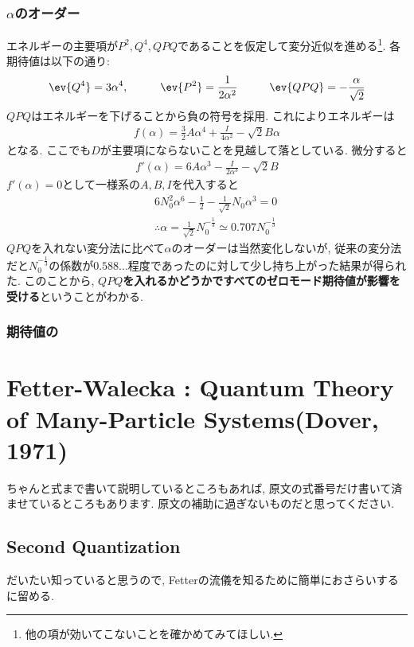 \documentclass[10.5pt,a4paper]{jreport}
\begin{document}
\subsection{$\alpha$のオーダー}
エネルギーの主要項が$P^2, Q^4, QPQ$であることを仮定して変分近似を進める\footnote{他の項が効いてこないことを確かめてみてほしい. }. 各期待値は以下の通り:
\begin{eqnarray}
  \ev{Q^4} = 3\alpha^4, \hspace{1cm}\ev{P^2} = \frac{1}{2\alpha^2}\hspace{1cm}\ev{QPQ} = -\frac{\alpha}{\sqrt{2}}
\end{eqnarray}
$QPQ$はエネルギーを下げることから負の符号を採用. これによりエネルギーは
\begin{eqnarray}
  f(\alpha) = \frac32A\alpha^4 + \frac{I}{4\alpha^2} - \sqrt{2}B\alpha
\end{eqnarray}
となる. ここでも$D$が主要項にならないことを見越して落としている. 微分すると
\begin{eqnarray}
  f'(\alpha) = 6A\alpha^3 - \frac{I}{2\alpha^3} - \sqrt{2}B
\end{eqnarray}
$f'(\alpha)=0$として一様系の$A, B, I$を代入すると
\begin{eqnarray}
  &&6N_0^2\alpha^6 - \frac{1}{2} - \frac{1}{\sqrt{2}}N_0\alpha^3 = 0\\
  &&\therefore \alpha = \frac{1}{\sqrt{2}}N_0^{-\frac13}\simeq 0.707N_0^{-\frac13}
\end{eqnarray}
$QPQ$を入れない変分法に比べて$\alpha$のオーダーは当然変化しないが, 従来の変分法だと$N_0^{-\frac13}$の係数が$0.588...$程度であったのに対して少し持ち上がった結果が得られた. このことから, \textbf{$QPQ$を入れるかどうかですべてのゼロモード期待値が影響を受ける}ということがわかる. 
\subsection{期待値の}
\newpage
\chapter{Fetter-Walecka : Quantum Theory of Many-Particle Systems(Dover, 1971)}
ちゃんと式まで書いて説明しているところもあれば, 原文の式番号だけ書いて済ませているところもあります. 原文の補助に過ぎないものだと思ってください. 
\section{Second Quantization}
だいたい知っていると思うので, Fetterの流儀を知るために簡単におさらいするに留める.
\end{document}
